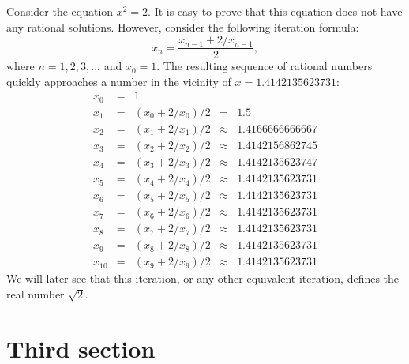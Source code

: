 \documentclass{tstextbook}
\begin{document}
    \begin{example}[Solving the equation $x^2 = 2$]
        Consider the equation $x^2 = 2$. It is easy to prove that this
        equation does not have any rational solutions. However, consider
        the following iteration formula:
        \begin{equation}
            x_n = \frac{x_{n-1} + 2 / x_{n - 1}}{2},
        \end{equation}
        where $n = 1,2,3,\ldots$ and $x_0 = 1$. The resulting sequence of
        rational numbers quickly approaches a number in the vicinity of
        $x = 1.4142135623731$:
        \begin{displaymath}
            \begin{array}{rclcl}
                x_0 & = & 1 \\
                x_{1}  & = & (x_{0} + 2 / x_{0}) / 2 & =       & 1.5             \\
                x_{2}  & = & (x_{1} + 2 / x_{1}) / 2 & \approx & 1.4166666666667 \\
                x_{3}  & = & (x_{2} + 2 / x_{2}) / 2 & \approx & 1.4142156862745 \\
                x_{4}  & = & (x_{3} + 2 / x_{3}) / 2 & \approx & 1.4142135623747 \\
                x_{5}  & = & (x_{4} + 2 / x_{4}) / 2 & \approx & 1.4142135623731 \\
                x_{6}  & = & (x_{5} + 2 / x_{5}) / 2 & \approx & 1.4142135623731 \\
                x_{7}  & = & (x_{6} + 2 / x_{6}) / 2 & \approx & 1.4142135623731 \\
                x_{8}  & = & (x_{7} + 2 / x_{7}) / 2 & \approx & 1.4142135623731 \\
                x_{9}  & = & (x_{8} + 2 / x_{8}) / 2 & \approx & 1.4142135623731 \\
                x_{10} & = & (x_{9} + 2 / x_{9}) / 2 & \approx & 1.4142135623731
            \end{array}
        \end{displaymath}
        We will later see that this iteration, or any other equivalent
        iteration, defines the real number $\sqrt{2}$.
    \end{example}


    \section{Third section}
\end{document}
